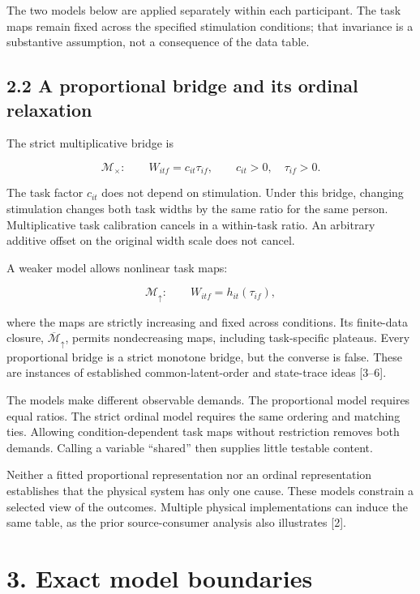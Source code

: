 \documentclass[
  11pt,
]{article}
\let\ctdoldsection\section
\renewcommand{\section}{\Needspace{8\baselineskip}\ctdoldsection}
\let\ctdoldsubsection\subsection
\renewcommand{\subsection}{\Needspace{6\baselineskip}\ctdoldsubsection}
\begin{document}
The two models below are applied separately within each participant. The
task maps remain fixed across the specified stimulation conditions; that
invariance is a substantive assumption, not a consequence of the data
table.

\hypertarget{a-proportional-bridge-and-its-ordinal-relaxation}{%
\subsection{2.2 A proportional bridge and its ordinal
relaxation}\label{a-proportional-bridge-and-its-ordinal-relaxation}}

The strict multiplicative bridge is

\[
\mathcal M_\times:\qquad W_{itf}=c_{it}\tau_{if},
\qquad c_{it}>0,\quad \tau_{if}>0.
\]

The task factor \(c_{it}\) does not depend on stimulation. Under this
bridge, changing stimulation changes both task widths by the same ratio
for the same person. Multiplicative task calibration cancels in a
within-task ratio. An arbitrary additive offset on the original width
scale does not cancel.

A weaker model allows nonlinear task maps:

\[
\mathcal M_\uparrow:\qquad W_{itf}=h_{it}(\tau_{if}),
\]

where the maps are strictly increasing and fixed across conditions. Its
finite-data closure, \(\overline{\mathcal M}_\uparrow\), permits
nondecreasing maps, including task-specific plateaus. Every proportional
bridge is a strict monotone bridge, but the converse is false. These are
instances of established common-latent-order and state-trace ideas
{[}3--6{]}.

The models make different observable demands. The proportional model
requires equal ratios. The strict ordinal model requires the same
ordering and matching ties. Allowing condition-dependent task maps
without restriction removes both demands. Calling a variable ``shared''
then supplies little testable content.

Neither a fitted proportional representation nor an ordinal
representation establishes that the physical system has only one cause.
These models constrain a selected view of the outcomes. Multiple
physical implementations can induce the same table, as the prior
source-consumer analysis also illustrates {[}2{]}.

\hypertarget{exact-model-boundaries}{%
\section{3. Exact model boundaries}\label{exact-model-boundaries}}
\end{document}
